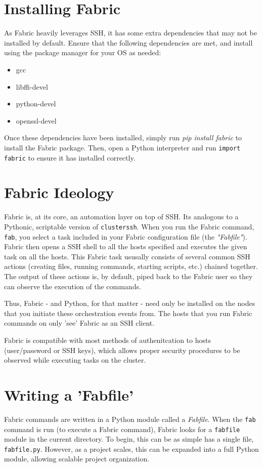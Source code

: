 \documentclass[9pt,twocolumn,twoside]{idsi}
\begin{document}
\section{Installing Fabric}
As Fabric heavily leverages SSH, it has some extra dependencies that may not be installed by default. Ensure that the following dependencies are met, and install using the package manager for your OS as needed:
\begin{itemize}
  \item gcc
  \item libffi-devel
  \item python-devel
  \item openssl-devel
\end{itemize}

Once these dependencies have been installed, simply run \emph{pip install fabric} to install the Fabric package.
Then, open a Python interpreter and run \texttt{import fabric} to ensure it has installed correctly.

\section{Fabric Ideology}
Fabric is, at its core, an automation layer on top of SSH. Its analogous to a Pythonic, scriptable version of \texttt{clusterssh}. When you run the Fabric command, \texttt{fab}, you select a task included in your Fabric configuration file (the \emph{"Fabfile"}). Fabric then opens a SSH shell to all the hosts specified and executes the given task on all the hosts. This Fabric task ususally consists of several common SSH actions (creating files, running commands, starting scripts, etc.) chained together. The output of these actions is, by default, piped back to the Fabric user so they can observe the execution of the commands.

Thus, Fabric - and Python, for that matter - need only be installed on the nodes that you initiate these orchestration events from. The hosts that you run Fabric commands on only 'see' Fabric as an SSH client.

Fabric is compatible with most methods of authenitcation to hosts (user/password or SSH keys), which allows proper security procedures to be observed while executing tasks on the cluster.

\section{Writing a 'Fabfile'}
Fabric commands are written in a Python module called a \emph{Fabfile}. When the \texttt{fab} command is run (to execute a Fabric command), Fabric looks for a \texttt{fabfile} module in the current directory. To begin, this can be as simple has a single file, \texttt{fabfile.py}. However, as a project scales, this can be expanded into a full Python module, allowing scalable project organization.
\end{document}
